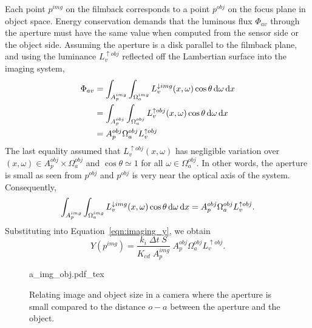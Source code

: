 Each point $p^{img}$ on the filmback corresponds to a point $p^{obj}$ on the
focus plane in object space. Energy conservation demands that the luminous flux
$\Phi_{av}$ through the aperture must have the same value when computed from the
sensor side or the object side. Assuming the aperture is a disk parallel to 
the filmback plane, and using the luminance $L_v^{\uparrow obj}$ reflected off
the Lambertian surface into the imaging system,
\begin{equation}\label{eqn:imaging_energyconservation}
    \begin{split}
    \Phi_{av} &= \int_{A_p^{img}} \int_{\Omega_a^{img}} L_v^{\downarrow img}(x,\omega) \cos\theta \mathop{}\!\mathrm{d}\omega \mathop{}\!\mathrm{d} x \\
              &= \int_{A_p^{obj}} \int_{\Omega_a^{obj}} L_v^{\uparrow obj}(x,\omega) \cos\theta \mathop{}\!\mathrm{d}\omega \mathop{}\!\mathrm{d} x  \\
              &= A_p^{obj} \Omega_a^{obj} L_v^{\uparrow obj} 
    \end{split}
\end{equation}
The last equality assumed that $L_v^{\uparrow obj}(x,\omega)$ has
negligible variation over $(x,\omega)\in A_p^{obj}\times\Omega^{obj}_a$
and $\cos\theta \simeq 1$ for all $\omega\in\Omega^{obj}_a$. 
In other words, the aperture is small as seen from $p^{obj}$
and $p^{obj}$ is very near the optical axis of the system. 
Consequently,
\begin{equation}
    \int_{A_p^{img}} \int_{\Omega_a^{img}} L_v^{\downarrow img}(x,\omega) \cos\theta \mathop{}\!\mathrm{d}\omega \mathop{}\!\mathrm{d} x 
     = A_p^{obj} \Omega_a^{obj}L_v^{\uparrow obj}.
\end{equation}
Substituting into Equation~\eqref{eqn:imaging_y}, we obtain
\begin{equation}\label{eqn:pixel_value_area_solidangle}
  Y(p^{img}) = \frac{k_i\; \Delta t \; S}{K_{cd}\;A^{img}_p} \; A_p^{obj} \Omega_a^{obj}L_v^{\uparrow obj}.
\end{equation}

\begin{figure}[t]
    \centering
    \def\svgwidth{0.9\linewidth}
    {a_img_obj.pdf_tex} 
    \caption{\label{fig:aperture_distance}%
        Relating image and object size in a camera where the aperture is small compared to the distance
        $o-a$ between the aperture and the object.}
\end{figure}

